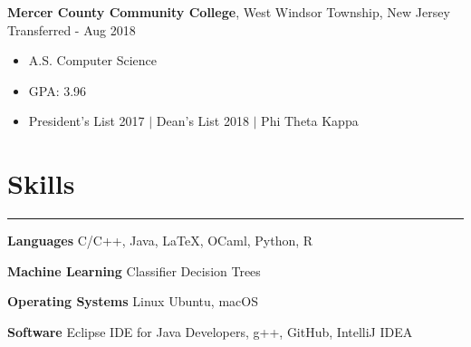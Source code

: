 \documentclass[10pt]{article}
\newcommand{\resumesection}[1]{\vspace{-0.2cm}\section*{#1}\vspace{-0.2cm}\hrule\vspace{0.2cm}}
\begin{document}
\textbf{Mercer County Community College}, West Windsor Township, New Jersey \hfill Transferred - Aug 2018
\begin{itemize}
	\item A.S. Computer Science
	\item GPA: 3.96 
	\item President's List 2017 $\vert$ Dean's List 2018 $\vert$ Phi Theta Kappa
\end{itemize}


\resumesection{Skills}
\textbf{Languages} C/C++, Java, \LaTeX, OCaml, Python, R

\textbf{Machine Learning} Classifier Decision Trees

\textbf{Operating Systems} Linux Ubuntu, macOS

\textbf{Software} Eclipse IDE for Java Developers, g++, GitHub, IntelliJ IDEA


%
\end{document}
